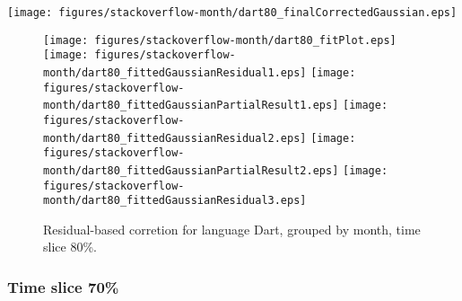 \begin{center}
{\texttt{[image: figures/stackoverflow-month/dart80\_finalCorrectedGaussian.eps]}}
\end{center}

\FloatBarrier

\begin{figure}[t]
\centering
{}
{\texttt{[image: figures/stackoverflow-month/dart80\_fitPlot.eps]}}
{\texttt{[image: figures/stackoverflow-month/dart80\_fittedGaussianResidual1.eps]}}
{\texttt{[image: figures/stackoverflow-month/dart80\_fittedGaussianPartialResult1.eps]}}
{\texttt{[image: figures/stackoverflow-month/dart80\_fittedGaussianResidual2.eps]}}
{\texttt{[image: figures/stackoverflow-month/dart80\_fittedGaussianPartialResult2.eps]}}
{\texttt{[image: figures/stackoverflow-month/dart80\_fittedGaussianResidual3.eps]}}
\caption{Residual-based corretion for language Dart, grouped by month, time slice 80\%.}
\end{figure}


\FloatBarrier


\subsubsection{Time slice 70\%}

